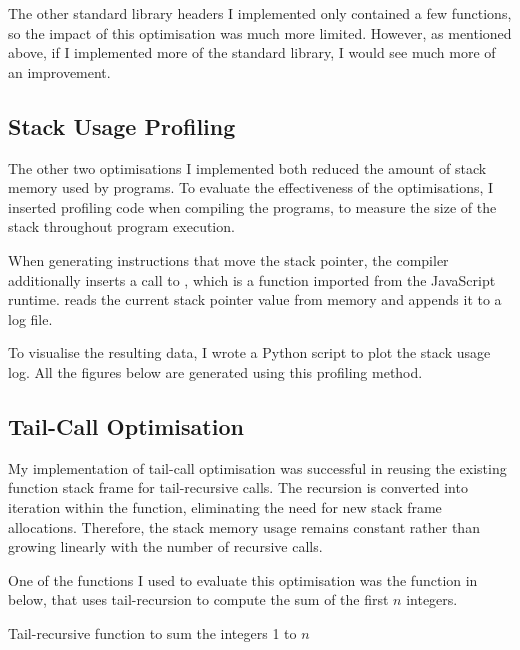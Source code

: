 \documentclass[00-main.tex]{subfiles}
\begin{document}
The other standard library headers I implemented only contained a few functions, so the impact of this optimisation was much more limited. However, as mentioned above, if I implemented more of the standard library, I would see much more of an improvement.

\subsection{Stack Usage Profiling}

The other two optimisations I implemented both reduced the amount of stack memory used by programs.
To evaluate the effectiveness of the optimisations, I inserted profiling code when compiling the programs, to measure the size of the stack throughout program execution.

When generating instructions that move the stack pointer, the compiler additionally inserts a call to , which is a function imported from the JavaScript runtime.
 reads the current stack pointer value from memory and appends it to a log file.

To visualise the resulting data, I wrote a Python script to plot the stack usage log.
All the figures below are generated using this profiling method.




\subsection{Tail-Call Optimisation}

My implementation of tail-call optimisation was successful in reusing the existing function stack frame for tail-recursive calls. The recursion is converted into iteration within the function, eliminating the need for new stack frame allocations.
Therefore, the stack memory usage remains constant rather than growing linearly with the number of recursive calls.

One of the functions I used to evaluate this optimisation was the function in  below, that uses tail-recursion to compute the sum of the first $n$ integers.

\begin{listing}[ht]
  \caption{Tail-recursive function to sum the integers 1 to $n$}
  \label{lst:tail-recursive sum}
\end{listing}
\end{document}
